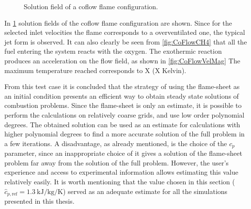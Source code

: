 \begin{figure}[t!]
	\centering
	\pgfplotsset{width=0.6\textwidth, compat=1.3}
	\par\bigskip
	\caption{Solution field of a coflow flame configuration.} \label{fig:CoFlowFlameFig}
\end{figure}


In \cref{fig:CoFlowFlameFig} solution fields of the coflow flame configuration are shown. Since for the selected inlet velocities the flame corresponds to a overventilated one, the typical jet form is observed. It can also clearly be seen from \cref{fig:CoFlowCH4} that all the fuel entering the system reacts with the oxygen. The exothermic reaction produces an acceleration on the flow field, as shown in  \cref{fig:CoFlowVelMag}
The maximum temperature reached corresponds to X (X Kelvin). %




From this test case it is concluded that the strategy of using the flame-sheet as an initial condition presents an efficient way to obtain steady state solutions of combustion problems. Since the flame-sheet is only an estimate, it is possible to perform the calculations on relatively coarse grids, and use low order polynomial degrees. The obtained solution can be used as an estimate for calculations with higher polynomial degrees to find a more accurate solution of the full problem in a few iterations. A disadvantage, as already mentioned, is the choice of the $c_p$ parameter, since an inappropriate choice of it gives a solution of the flame-sheet problem far away from the solution of the full problem. However, the user's experience and access to experimental information allows estimating this value relatively easily. It is worth mentioning that the value chosen in this section ($\hat{c}_{p,\text{ref}}= \SI{1.3}{\kilo \joule \per \kilo \gram \per \kelvin}$)  served as an adequate estimate for all the simulations presented in this thesis.  



